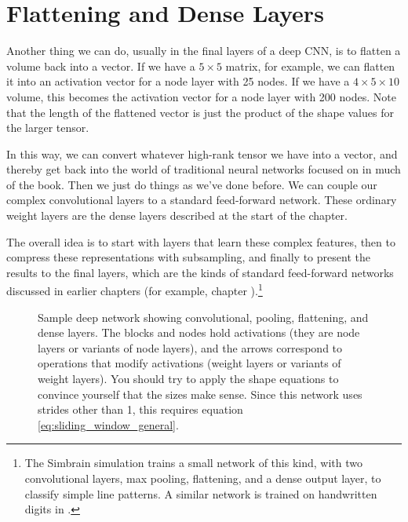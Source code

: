\section{Flattening and Dense Layers}\label{sect_flatten}

Another thing we can do, usually in the final layers of a deep CNN, is to flatten a volume back into a vector. If we have a $5 \times 5$ matrix, for example, we can flatten it into an activation vector for a node layer with 25 nodes. If we have a $4 \times 5 \times 10$ volume, this becomes the activation vector for a node layer with 200 nodes.  Note that the length of the flattened vector is just the product of the shape values for the larger tensor.

In this way, we can convert whatever high-rank tensor we have into a vector, and thereby get back into the world of  traditional neural networks focused on in much of the book.  Then we just do things as we've done before.  We can couple our complex convolutional layers to a standard feed-forward network.  These ordinary weight layers are the dense layers described at the start of the chapter.

The overall idea is to start with layers that learn these complex features, then to compress these representations with subsampling, and finally to present the results to the final layers, which are the kinds of standard feed-forward networks discussed in earlier chapters (for example, chapter ).\footnote{The Simbrain simulation  trains a small network of this kind, with two convolutional layers, max pooling, flattening, and a dense output layer, to classify simple line patterns. A similar network is trained on handwritten digits in .}

\begin{figure}[h]
\centering
{}
\caption[Soraya Boza and Jeff Yoshimi.]{Sample deep network showing convolutional, pooling, flattening, and dense layers. The blocks and nodes hold activations (they are node layers or variants of node layers), and the arrows correspond to operations that modify activations (weight layers or variants of weight layers). You should try to apply the shape equations to convince yourself that the sizes make sense. Since this network uses strides other than 1, this requires equation \ref{eq:sliding_window_general}.}
\label{deepNetExample}
\end{figure}

